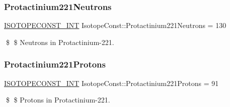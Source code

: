 \subsubsection{\texorpdfstring{Protactinium221\+Neutrons}{Protactinium221Neutrons}}
{\footnotesize\ttfamily \mbox{\hyperlink{group___isotope_const-_macros_ga5f18360b3e99483a35c32d789e62621c}{I\+S\+O\+T\+O\+P\+E\+C\+O\+N\+S\+T\+\_\+\+I\+NT}} Isotope\+Const\+::\+Protactinium221\+Neutrons = 130}

\$ \$ Neutrons in Protactinium-\/221. \mbox{\label{group___isotope_const-_protactinium-_pa221_ga4ec0e9b0753c9d9514614747df0f420e}} 
\subsubsection{\texorpdfstring{Protactinium221\+Protons}{Protactinium221Protons}}
{\footnotesize\ttfamily \mbox{\hyperlink{group___isotope_const-_macros_ga5f18360b3e99483a35c32d789e62621c}{I\+S\+O\+T\+O\+P\+E\+C\+O\+N\+S\+T\+\_\+\+I\+NT}} Isotope\+Const\+::\+Protactinium221\+Protons = 91}

\$ \$ Protons in Protactinium-\/221. 